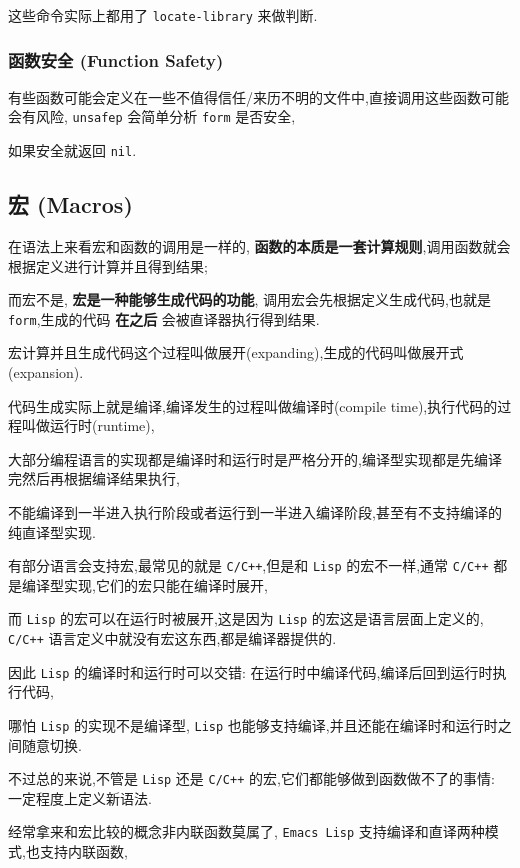 \documentclass[11pt]{article}
\begin{document}
这些命令实际上都用了 \texttt{locate-library} 来做判断.


\subsubsection{函数安全 (Function Safety)}
\label{sec:org7ced617}

有些函数可能会定义在一些不值得信任/来历不明的文件中,直接调用这些函数可能会有风险, \texttt{unsafep} 会简单分析 \texttt{form} 是否安全,

如果安全就返回 \texttt{nil}.


\subsection{宏 (Macros)}
\label{sec:org49f5b21}

在语法上来看宏和函数的调用是一样的, \textbf{函数的本质是一套计算规则},调用函数就会根据定义进行计算并且得到结果;

而宏不是, \textbf{宏是一种能够生成代码的功能}, 调用宏会先根据定义生成代码,也就是 \texttt{form},生成的代码 \textbf{在之后} 会被直译器执行得到结果.

宏计算并且生成代码这个过程叫做展开(expanding),生成的代码叫做展开式(expansion).

代码生成实际上就是编译,编译发生的过程叫做编译时(compile time),执行代码的过程叫做运行时(runtime),

大部分编程语言的实现都是编译时和运行时是严格分开的,编译型实现都是先编译完然后再根据编译结果执行,

不能编译到一半进入执行阶段或者运行到一半进入编译阶段,甚至有不支持编译的纯直译型实现.

有部分语言会支持宏,最常见的就是 \texttt{C/C++},但是和 \texttt{Lisp} 的宏不一样,通常 \texttt{C/C++} 都是编译型实现,它们的宏只能在编译时展开,

而 \texttt{Lisp} 的宏可以在运行时被展开,这是因为 \texttt{Lisp} 的宏这是语言层面上定义的, \texttt{C/C++} 语言定义中就没有宏这东西,都是编译器提供的.

因此 \texttt{Lisp} 的编译时和运行时可以交错: 在运行时中编译代码,编译后回到运行时执行代码,

哪怕 \texttt{Lisp} 的实现不是编译型, \texttt{Lisp} 也能够支持编译,并且还能在编译时和运行时之间随意切换.

不过总的来说,不管是 \texttt{Lisp} 还是 \texttt{C/C++} 的宏,它们都能够做到函数做不了的事情: 一定程度上定义新语法.

经常拿来和宏比较的概念非内联函数莫属了, \texttt{Emacs Lisp} 支持编译和直译两种模式,也支持内联函数,
\end{document}
